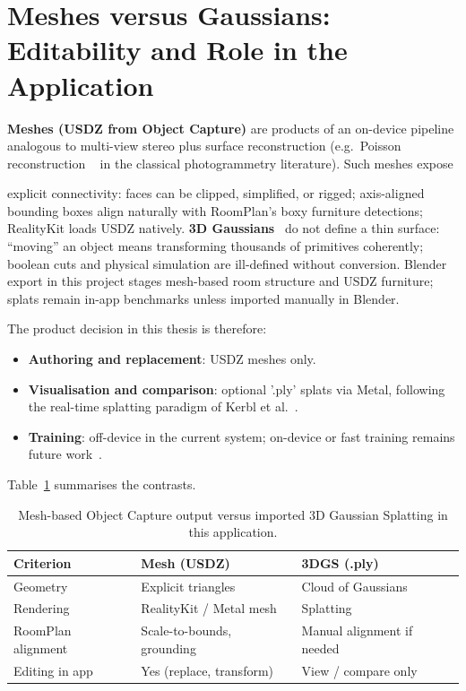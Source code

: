 \section{Meshes versus Gaussians: Editability and Role in the Application}
\label{sec:3dgs_vs_mesh}

\textbf{Meshes (USDZ from Object Capture)} are products of an on-device pipeline
analogous to multi-view stereo plus surface reconstruction (e.g.\ Poisson
reconstruction ~\cite{kazhdan2006poisson} in the classical photogrammetry literature).
Such meshes expose {explicit connectivity: faces can be clipped, simplified, or
rigged; axis-aligned bounding boxes align naturally with RoomPlan's boxy furniture
detections; RealityKit loads USDZ natively. \textbf{3D Gaussians}~\cite{kerbl20233dgs}
do not define a thin surface: ``moving'' an object means transforming thousands of
primitives coherently; boolean cuts and physical simulation are ill-defined without
conversion. Blender export in this project stages mesh-based room structure and USDZ
furniture; splats remain in-app benchmarks unless imported manually in Blender.

The product decision in this thesis is therefore:

\begin{itemize}
    \item \textbf{Authoring and replacement}: USDZ meshes only.

    \item \textbf{Visualisation and comparison}: optional '.ply' splats via
    Metal, following the real-time splatting paradigm of Kerbl et al.~\cite{kerbl20233dgs}.

    \item \textbf{Training}: off-device in the current system; on-device or fast
    training remains future work~\cite{Guo26}.
\end{itemize}

Table~\ref{tab:mesh_vs_3dgs} summarises the contrasts.

\begin{table}[htbp]
\centering
\caption{Mesh-based Object Capture output versus imported 3D Gaussian Splatting in this application.}
\label{tab:mesh_vs_3dgs}
\begin{tabular}{|p{}|p{}|p{}|}
\hline
\textbf{Criterion} & \textbf{Mesh (USDZ)} & \textbf{3DGS (.ply)} \\
\hline
Geometry & Explicit triangles & Cloud of Gaussians \\
\hline
Rendering & RealityKit / Metal mesh & Splatting~\cite{kerbl20233dgs} \\
\hline
RoomPlan alignment & Scale-to-bounds, grounding & Manual alignment if needed \\
\hline
Editing in app & Yes (replace, transform) & View / compare only \\
\hline
\end{tabular}
\end{table}

}
